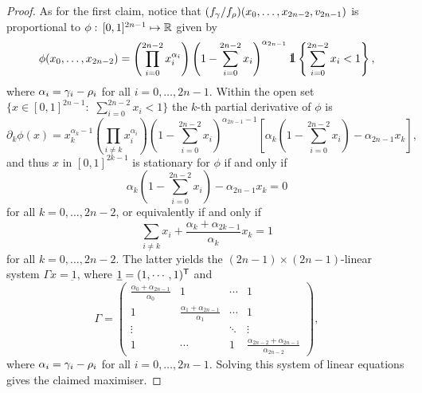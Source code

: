 \documentclass[10pt, article,table]{article}
\begin{document}
\begin{proof}
As for the first claim, notice that $(\dirichletDensity[\dirparam]/\dirichletDensity[\rho]) (x_0,\dots,x_{2n-2},v_{2n-1})$ is proportional to $\phi:\,  [0,1]^{2n-1} \mapsto \R$ given by 
\begin{equation*}
 \phi(x_0,\dots,x_{2n-2}) = 
 \left( \prod_{i=0}^{2n-2} x_{i}^{\alpha_i}\right)
 \left( 1-\sum_{i=0}^{2n-2} x_i \right)^{\alpha_{2n-1}}
 \one\left\lbrace \sum_{i=0}^{2n-2} x_i < 1 \right\rbrace,
\end{equation*}
where $\alpha_i = \dirparam_i  - \rho_i$ for all $i=0,\dots,2n-1$. Within the open set $\lbrace x \in [0,1]^{2n-1}: \, \, \sum_{i=0}^{2n-2} x_i < 1 \rbrace$ the $k$-th partial derivative of $\phi$ is 
\begin{equation*}
 \partial_k \phi(x) = 
 x_{k}^{\alpha_k -1 } 
 \left( \prod_{i\neq k } x_{i}^{\alpha_i}\right)
 \left( 1-\sum_{i=0}^{2n-2} x_i \right)^{\alpha_{2n-1}-1}
 \left[
 \alpha_k \left( 1-\sum_{i=0}^{2n-2} x_i \right) - \alpha_{2n-1} x_k
 \right],
\end{equation*}
and thus $x$ in $[0,1]^{2k-1}$ is stationary for $\phi$ if and only if 
\begin{equation*}
 \alpha_k \left( 1-\sum_{i=0}^{2n-2} x_i \right) - \alpha_{2n-1} x_k = 0
\end{equation*}
for all $k=0,\dots,2n-2$, or equivalently if and only if  
\begin{equation*}
 \sum_{i\neq k} x_i + \frac{\alpha_k + \alpha_{2k-1}}{\alpha_k}x_k = 1
\end{equation*}
for all $k=0,\dots,2n-2$. The latter yields the $(2n-1)\times(2n-1)$-linear system $\Gamma x = \underbar{1}$, where $\underbar{1} = (1,\cdots,1)\transpose$ and 
 \begin{equation*}
  \Gamma = 
  \begin{pmatrix}
   \frac{\alpha_{0} + \alpha_{2n-1}}{\alpha_0}
   &   1   &   \cdots   &   1
   \\
   1 &
   \frac{\alpha_{1} + \alpha_{2n-1}}{\alpha_1}
   & \cdots & 1 
   \\
   \vdots & & \ddots & \vdots\\
   1 &\cdots & 1 &
   \frac{\alpha_{2n-2} + \alpha_{2n-1}}{\alpha_{2n-2}}
  \end{pmatrix},
 \end{equation*}
 where $\alpha_i = \dirparam_i  - \rho_i$ for all $i=0,\dots,2n-1$. Solving this system of linear equations gives the claimed maximiser.
 

\end{proof}
\end{document}
